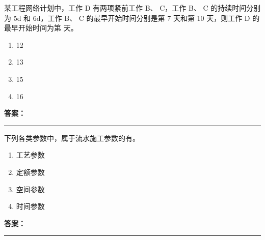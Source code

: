 \documentclass[UTF8,fontset=fandol,11pt]{ctexart}
\newcommand{\answerline}{\textcolor{answerred}{\rule{2.4cm}{0.7pt}}}
\begin{document}
\vspace{0.2em}

\begin{quizbox}[title={乱序第 113 题｜第十一章网络计划技术}]

某工程网络计划中，工作 D 有两项紧前工作 B、 C，工作 B、 C 的持续时间分别为 5d 和 6d，工作 B、 C 的最早开始时间分别是第 7 天和第 10 天，则工作 D 的最早开始时间为第 天。\\

\begin{enumerate}[label=\Alph*.]

\item 12

\item 13

\item 15

\item 16

\end{enumerate}

\textbf{\textcolor{answerred}{答案：}} \answerline

\end{quizbox}

\vspace{0.2em}

\begin{quizbox}[title={乱序第 114 题｜第十章流水施工原理}]

下列各类参数中，属于流水施工参数的有。\\

\begin{enumerate}[label=\Alph*.]

\item 工艺参数

\item 定额参数

\item 空间参数

\item 时间参数

\end{enumerate}

\textbf{\textcolor{answerred}{答案：}} \answerline

\end{quizbox}

\vspace{0.2em}
\end{document}
